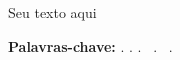 
\begin{resumo}

\setlength{\parindent}{0pt}
\setlength{\parskip}{0pt}
\singlespacing
\normalsize

Seu texto aqui

\vspace{0.5cm}

{\normalsize\bfseries Palavras-chave:} \normalsize
\palavrachaveum. \palavrachavedois. \palavrachavetres.%
\ifx\palavrachavequatro\empty\else
    \ \palavrachavequatro.%
\fi
\ifx\palavrachavecinco\empty\else
    \ \palavrachavecinco.%
\fi

\end{resumo}

